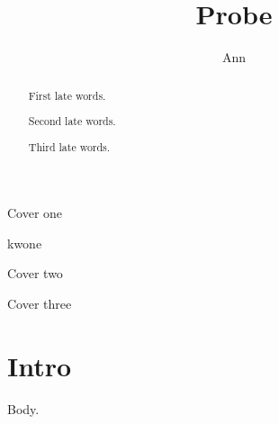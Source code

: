 \documentclass{IEEEtran}
\begin{document}
\title{Probe}\author{Ann}
\maketitle
\begin{center}Cover one\end{center}
\begin{abstract}First late words.\end{abstract}
\begin{IEEEkeywords}kwone\end{IEEEkeywords}
\begin{center}Cover two\end{center}
\begin{abstract}Second late words.\end{abstract}
\begin{center}Cover three\end{center}
\begin{abstract}Third late words.\end{abstract}
\section{Intro}
Body.
\end{document}
